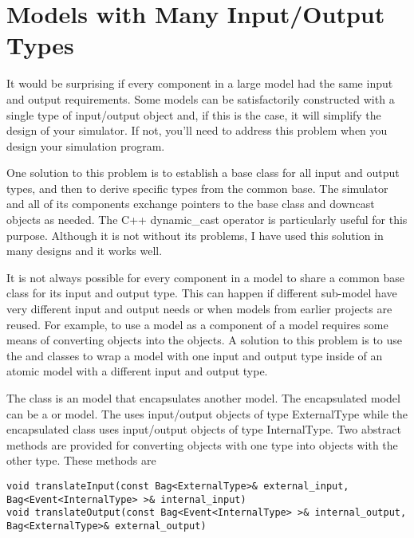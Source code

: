 \chapter{Models with Many Input/Output Types}
\label{section:models_with_many_io_types}
It would be surprising if every component in a large model had the same input and output requirements. Some models can be satisfactorily constructed with a single type of input/output object and, if this is the case, it will simplify the design of your simulator. If not, you'll need to address this problem when you design your simulation program.
 
One solution to this problem is to establish a base class for all input and output types, and then to derive specific types from the common base. The simulator and all of its components exchange pointers to the base class and downcast objects as needed. The C++ dynamic\_cast operator is particularly useful for this purpose. Although it is not without its problems, I have used this solution in many designs and it works well.

It is not always possible for every component in a model to share a common base class for its input and output type. This can happen if different sub-model have very different input and output needs or when models from earlier projects are reused. For example, to use a  model as a component of a  model requires some means of converting  objects into the  objects. A solution to this problem is to use the  and  classes to wrap a model with one input and output type inside of an atomic model with a different input and output type.

The  class is an  model that encapsulates another model. The encapsulated model can be a  or  model. The  uses input/output objects of type ExternalType while the encapsulated class uses input/output objects of type InternalType. Two abstract methods are provided for converting objects with one type into objects with the other type. These methods are
\begin{verbatim}
void translateInput(const Bag<ExternalType>& external_input, Bag<Event<InternalType> >& internal_input)
void translateOutput(const Bag<Event<InternalType> >& internal_output, Bag<ExternalType>& external_output) 
\end{verbatim}


